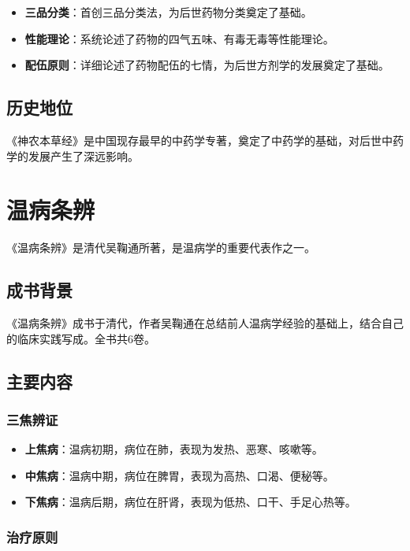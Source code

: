 \documentclass[12pt,UTF8]{ctexbook}
\begin{document}
\begin{itemize}
\item \textbf{三品分类}：首创三品分类法，为后世药物分类奠定了基础。
\item \textbf{性能理论}：系统论述了药物的四气五味、有毒无毒等性能理论。
\item \textbf{配伍原则}：详细论述了药物配伍的七情，为后世方剂学的发展奠定了基础。
\end{itemize}

\subsection{历史地位}

《神农本草经》是中国现存最早的中药学专著，奠定了中药学的基础，对后世中药学的发展产生了深远影响。

\section{温病条辨}

《温病条辨》是清代吴鞠通所著，是温病学的重要代表作之一。

\subsection{成书背景}

《温病条辨》成书于清代，作者吴鞠通在总结前人温病学经验的基础上，结合自己的临床实践写成。全书共6卷。

\subsection{主要内容}

\subsubsection{三焦辨证}

\begin{itemize}
\item \textbf{上焦病}：温病初期，病位在肺，表现为发热、恶寒、咳嗽等。
\item \textbf{中焦病}：温病中期，病位在脾胃，表现为高热、口渴、便秘等。
\item \textbf{下焦病}：温病后期，病位在肝肾，表现为低热、口干、手足心热等。
\end{itemize}

\subsubsection{治疗原则}
\end{document}
